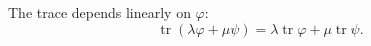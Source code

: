 The trace depends linearly on $\varphi$:
$$\operatorname{tr} (\lambda \varphi + \mu \psi) = \lambda \operatorname{tr} \varphi + \mu \operatorname{tr} \psi.$$
